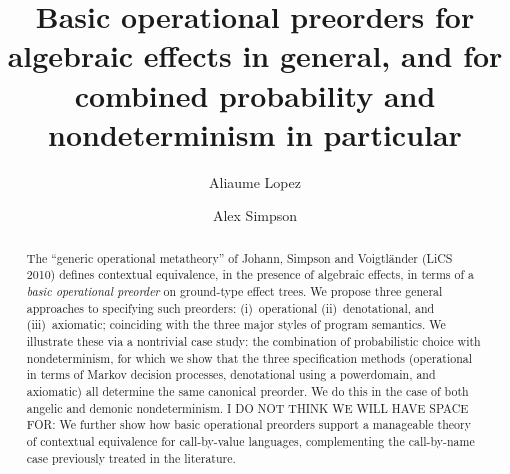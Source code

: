 \documentclass[a4paper,UKenglish]{lipics-v2018}
\title{Basic operational preorders  for algebraic effects in general, and for
combined probability and nondeterminism in particular}
\author{Aliaume Lopez}{\'Ecole Normale Sup\'erieure Paris-Saclay\\{Universit\'e Paris-Saclay, France}}{aliaume.lopez@ens-paris-saclay.fr}{}{}%
\author{Alex Simpson}{Faculty of Mathematics and Physics\\{University of Ljubljana, Slovenia}}{Alex.Simpson@fmf.uni-lj.si}{}{Research supported by: [[TO COMPLETE]]}
\begin{document}
\maketitle

\begin{abstract}
The ``generic operational metatheory'' of  Johann, Simpson and Voigtl\"{a}nder (LiCS 2010) defines
contextual equivalence, 
in the presence of algebraic effects, in terms of a
\emph{basic operational preorder} on ground-type effect trees. We propose three general approaches to 
specifying such preorders: (i)~operational (ii)~denotational, and (iii)~axiomatic; coinciding with the three major styles of program semantics. We illustrate these via a nontrivial case study: the combination of probabilistic choice with nondeterminism, for which we show that  the three specification methods (operational in terms of Markov decision processes, denotational using  a powerdomain, and axiomatic) all determine the same canonical preorder. We do this in the case of both angelic and demonic nondeterminism. 
I DO NOT THINK WE WILL HAVE SPACE FOR:
We further show how basic operational preorders support a manageable theory of contextual equivalence for call-by-value languages, complementing the call-by-name case previously treated in the literature.
 \end{abstract}






















\newpage

\appendix




















\end{document}
